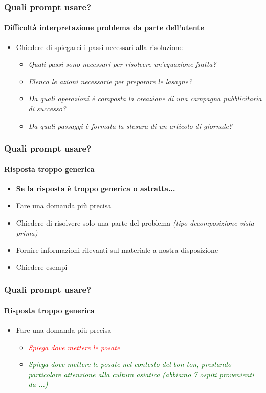 \begin{exampleframe}
    \frametitle{Quali prompt usare?}
    \framesubtitle{Difficoltà interpretazione problema da parte dell'utente}

    \begin{itemize}
        \item Chiedere di spiegarci i passi necessari alla risoluzione
        \begin{itemize}
            \item \textit{Quali passi sono necessari per risolvere un'equazione fratta?}
            \item \textit{Elenca le azioni necessarie per preparare le lasagne?}
            \item \textit{Da quali operazioni è composta la creazione di una campagna pubblicitaria di successo?}
            \item \textit{Da quali passaggi è formata la stesura di un articolo di giornale?}
        \end{itemize}
    \end{itemize}
\end{exampleframe}

\begin{contentframe}
    \frametitle{Quali prompt usare?}
    \framesubtitle{Risposta troppo generica}
    
    \begin{itemize}
        \item \textbf{Se la risposta è troppo generica o astratta...}

        \bigskip
        \item Fare una domanda più precisa
        \item Chiedere di risolvere solo una parte del problema \textit{(tipo decomposizione vista prima)}
        \item Fornire informazioni rilevanti sul materiale a nostra disposizione
        \item Chiedere esempi
    \end{itemize}
\end{contentframe}

\begin{exampleframe}
    \frametitle{Quali prompt usare?}
    \framesubtitle{Risposta troppo generica}

    \begin{itemize}
        \item Fare una domanda più precisa
        \begin{itemize}
            \item \textcolor{red}{\textit{Spiega dove mettere le posate}}
            \item \textcolor{DarkGreen}{\textit{Spiega dove mettere le posate nel contesto del bon ton, prestando particolare attenzione alla cultura asiatica (abbiamo 7 ospiti provenienti da ...)}}
        \end{itemize}
    \end{itemize}
\end{exampleframe}

